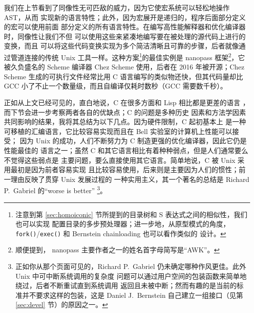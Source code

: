 我们在上节看到了同像性无可匹敌的威力，因为它使宏系统可以轻松地操作 AST，从而
实现新的语言特性；此外，因为宏展开是递归的，程序后面部分定义的宏可以使用前面
部分定义的所有语言特性。在编写高性能解释器和优化编译器时，同像性让我们不但
可以使用这些来紧凑地编写要在被处理的源代码上进行的变换，而且
可以将这些代码变换实现为多个简洁清晰且可靠的步骤，后者就像通过管道连接的传统
Unix 工具一样。这种方案\footnote{\label{fn:slew}注意到第
\ref{sec:homoiconic} 节所提到的目录树和 S 表达式之间的相似性，我们也可以实现
配置目录的多步预处理器；进一步地，从原型模式的角度，%
\texttt{fork()}/\texttt{exec()} 和 Bernstein chainloading 也可以看作类似的
设计。}的最佳实例是 nanopass 框架\footnote{顺便提到，%
nanopass 主要作者之一的姓名首字母简写是“AWK”。}，它被久负盛名的 Scheme 编译器
Chez Scheme 使用，后者在 2016 年被开源；Chez Scheme
生成的可执行文件经常比用 C 语言编写的类似物还快，但其代码量却比
GCC 小了不止一个数量级，而且自编译仅耗时数秒（GCC 需要数千秒）。

正如从上文已经可见的，直白地说，C 在很多方面和 Lisp 相比都是更差的语言%
，而下节会进一步考察两者各自的优缺点；C 的问题是多种历史
因素和方法学因素共同影响的结果，我将其总结为以下几点。因为硬件限制，C 起初基本上
是一种可移植的汇编语言，它比较容易实现而且在 Bell 实验室的计算机上性能可以接受；
因为 Unix 的成功，人们不断努力为 C 制造更强的优化编译器，因此它仍是性能最佳的
语言之一；虽然 C 和其它语言相比有着种种弱点，但是人们通常要么不觉得这些弱点是
主要问题，要么直接使用其它语言。简单地说，C 被 Unix 采用最初是因为前者容易实现
且比较容易使用，后来则是主要因为人们的惯性；前一理由反映了贯穿 Unix 发展过程的
一种实用主义，其一个著名的总结是 Richard P.\ Gabriel 的“worse is better”%
\footnote{正如你从那个页面可见的，Richard
P.\ Gabriel 仍未确定哪种作风更佳。此外 Unix 中可中断系统调用的复杂度
问题可以通过用户空间的包装函数来简单地绕过，后者不断重试直到系统调用
返回且未被中断；然而有趣的是当前的标准并不要求这样的包装，这是 Daniel
J.\ Bernstein 自己建立一组接口（见第 \ref{sec:devel} 节）的原因之一。}。

